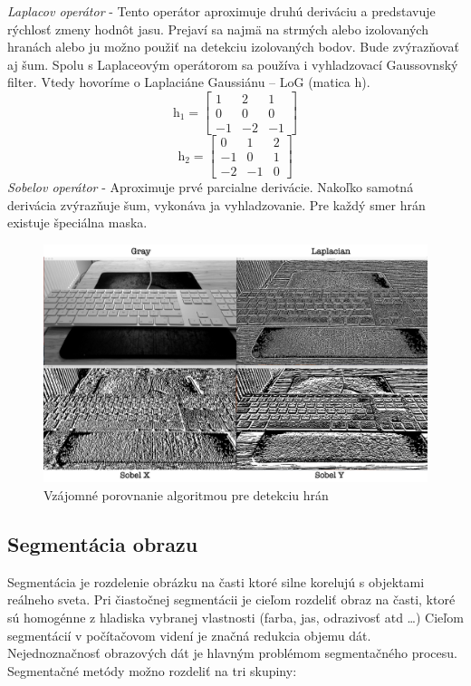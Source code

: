 \textit{Laplacov operátor} - Tento operátor aproximuje druhú deriváciu a predstavuje rýchlosť zmeny hodnôt jasu. Prejaví sa najmä na strmých alebo izolovaných hranách alebo ju možno použiť na detekciu izolovaných bodov. Bude zvýrazňovať aj šum. Spolu s Laplaceovým operátorom sa používa i vyhladzovací Gaussovnský filter. Vtedy hovoríme o Laplaciáne Gaussiánu – LoG (matica h).
$$\textit{h}_1=\begin{bmatrix} 1 & 2 & 1 \\ 0 & 0 & 0 \\ -1 & -2 & -1  \end{bmatrix}$$
$$\textit{h}_2=\begin{bmatrix} 0 & 1 & 2 \\ -1 & 0 & 1 \\ -2 & -1 & 0  \end{bmatrix}$$
\textit{Sobelov operátor} - Aproximuje prvé parcialne derivácie. Nakoľko samotná derivácia zvýrazňuje šum, vykonáva ja vyhladzovanie. Pre každý smer hrán existuje špeciálna maska.


\begin{figure}[H]
\begin{center}
	\includegraphics[scale=0.16]{obrazky/hranove_filtre}
	\caption{Vzájomné porovnanie algoritmou pre detekciu hrán}
	\end{center}
\end{figure}


\subsection{Segmentácia obrazu}
Segmentácia je rozdelenie obrázku na časti ktoré silne korelujú s objektami reálneho sveta. Pri čiastočnej segmentácii je cieľom rozdeliť obraz na časti, ktoré sú homogénne z hladiska vybranej vlastnosti (farba, jas, odrazivosť atd …) Cieľom segmentácií v počítačovom videní je značná redukcia objemu dát. Nejednoznačnosť obrazových dát je hlavným problémom segmentačného procesu. Segmentačné metódy možno rozdeliť na tri skupiny: 


